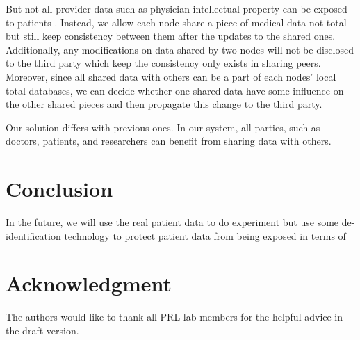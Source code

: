 \documentclass[conference]{IEEEtran}
\begin{document}
But not all provider data such as physician intellectual property can be exposed to patients \cite{us2017individuals, grossman2011clinical}. Instead, we allow each node share a piece of medical data not total but still keep consistency between them after the updates to the shared ones. Additionally, any modifications on data shared by two nodes will not be disclosed to the third party which keep the consistency only exists in sharing peers. Moreover, since all shared data with others can be a part of each nodes' local total databases, we can decide whether one shared data have some influence on the other shared pieces and then propagate this change to the third party.

Our solution differs with previous ones. In our system, all parties, such as doctors, patients, and researchers can benefit from sharing data with others. 


\section{Conclusion}

In the future, we will use the real patient data to do experiment but use some de-identification technology to protect patient data from being exposed in terms of  

\section*{Acknowledgment}
The authors would like to thank all PRL lab members for the helpful advice in the draft version. 



\end{document}
